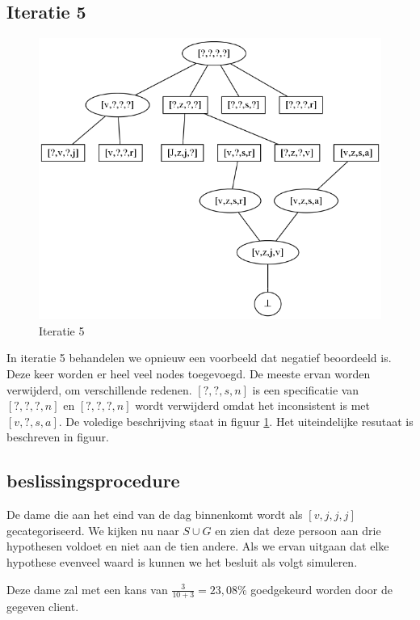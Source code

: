 \documentclass[alternative-exam.tex]{subfiles}
\begin{document}
\subsection{Iteratie 5}
\begin{figure}
[H]
\centering
\caption{Iteratie 5}
\label{iter_5}
\includegraphics[scale=0.5]{resources/graphs/iteration_5.png}
\end{figure}
In iteratie 5 behandelen we opnieuw een voorbeeld dat negatief beoordeeld is. Deze keer worden er heel veel nodes toegevoegd. De meeste ervan worden verwijderd, om verschillende redenen. $[?,?,s,n]$ is een specificatie van $[?,?,?,n]$ en $[?,?,?,n]$ wordt verwijderd omdat het inconsistent is met $[v,?,s,a]$. De voledige beschrijving staat in figuur \ref{iter_5}. Het uiteindelijke resutaat is beschreven in figuur.


\subsection{beslissingsprocedure}
De dame die aan het eind van de dag binnenkomt wordt als $[v,j,j,j]$ gecategoriseerd.
We kijken nu naar $S\cup G$ en zien dat deze persoon aan drie hypothesen voldoet en niet aan de tien andere. Als we ervan uitgaan dat elke hypothese evenveel waard is kunnen we het besluit als volgt simuleren.
\begin{center}
Deze dame zal met een kans van $\frac{3}{10+3} = 23,08 \%$ goedgekeurd worden door de gegeven client.
\end{center}
\end{document}
